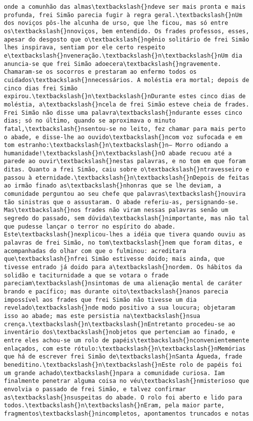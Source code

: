 \begin{Verbatim}[commandchars=\\\{\}]
onde a comunhão das almas\textbackslash{}ndeve ser mais pronta e mais profunda, frei Simão parecia fugir à regra geral.\textbackslash{}nUm dos noviços pôs-lhe alcunha de urso, que lhe ficou, mas só entre os\textbackslash{}nnoviços, bem entendido. Os frades professos, esses, apesar do desgosto que o\textbackslash{}ngênio solitário de frei Simão lhes inspirava, sentiam por ele certo respeito e\textbackslash{}nveneração.\textbackslash{}n\textbackslash{}nUm dia anuncia-se que frei Simão adoecera\textbackslash{}ngravemente. Chamaram-se os socorros e prestaram ao enfermo todos os cuidados\textbackslash{}nnecessários. A moléstia era mortal; depois de cinco dias frei Simão expirou.\textbackslash{}n\textbackslash{}nDurante estes cinco dias de moléstia, a\textbackslash{}ncela de frei Simão esteve cheia de frades. Frei Simão não disse uma palavra\textbackslash{}ndurante esses cinco dias; só no último, quando se aproximava o minuto fatal,\textbackslash{}nsentou-se no leito, fez chamar para mais perto o abade, e disse-lhe ao ouvido\textbackslash{}ncom voz sufocada e em tom estranho:\textbackslash{}n\textbackslash{}n— Morro odiando a humanidade!\textbackslash{}n\textbackslash{}nO abade recuou até a parede ao ouvir\textbackslash{}nestas palavras, e no tom em que foram ditas. Quanto a frei Simão, caiu sobre o\textbackslash{}ntravesseiro e passou à eternidade.\textbackslash{}n\textbackslash{}nDepois de feitas ao irmão finado as\textbackslash{}nhonras que se lhe deviam, a comunidade perguntou ao seu chefe que palavras\textbackslash{}nouvira tão sinistras que o assustaram. O abade referiu-as, persignando-se. Mas\textbackslash{}nos frades não viram nessas palavras senão um segredo do passado, sem dúvida\textbackslash{}nimportante, mas não tal que pudesse lançar o terror no espírito do abade. Este\textbackslash{}nexplicou-lhes a idéia que tivera quando ouviu as palavras de frei Simão, no tom\textbackslash{}nem que foram ditas, e acompanhadas do olhar com que o fulminou: acreditara que\textbackslash{}nfrei Simão estivesse doido; mais ainda, que tivesse entrado já doido para a\textbackslash{}nordem. Os hábitos da solidão e taciturnidade a que se votara o frade pareciam\textbackslash{}nsintomas de uma alienação mental de caráter brando e pacífico; mas durante oito\textbackslash{}nanos parecia impossível aos frades que frei Simão não tivesse um dia revelado\textbackslash{}nde modo positivo a sua loucura; objetaram isso ao abade; mas este persistia na\textbackslash{}nsua crença.\textbackslash{}n\textbackslash{}nEntretanto procedeu-se ao inventário dos\textbackslash{}nobjetos que pertenciam ao finado, e entre eles achou-se um rolo de papéis\textbackslash{}nconvenientemente enlaçados, com este rótulo:\textbackslash{}n\textbackslash{}nMemórias que há de escrever frei Simão de\textbackslash{}nSanta Águeda, frade beneditino.\textbackslash{}n\textbackslash{}nEste rolo de papéis foi um grande achado\textbackslash{}npara a comunidade curiosa. Iam finalmente penetrar alguma coisa no véu\textbackslash{}nmisterioso que envolvia o passado de frei Simão, e talvez confirmar as\textbackslash{}nsuspeitas do abade. O rolo foi aberto e lido para todos.\textbackslash{}n\textbackslash{}nEram, pela maior parte, fragmentos\textbackslash{}nincompletos, apontamentos truncados e notas 
\end{Verbatim}
